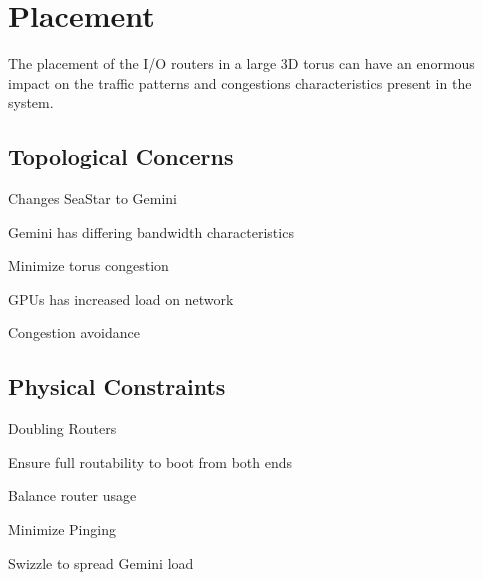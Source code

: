 \section{Placement}

The placement of the I/O routers in a large 3D torus can have an enormous impact
on the traffic patterns and congestions characteristics present in the system.

\subsection{Topological Concerns}

Changes SeaStar to Gemini

Gemini has differing bandwidth characteristics

Minimize torus congestion

GPUs has increased load on network

Congestion avoidance

\subsection{Physical Constraints}

Doubling Routers

Ensure full routability to boot from both ends

Balance router usage

Minimize Pinging

Swizzle to spread Gemini load

